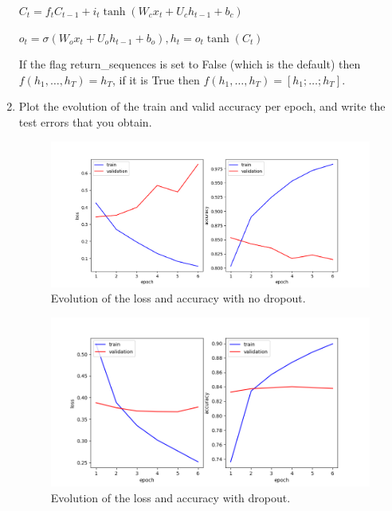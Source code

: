 \documentclass{article} %
\begin{document}
\begin{enumerate}
\begin{center}
        $C_t = f_t C_{t - 1} + i_t \tanh(W_c x_t + U_c h_{t - 1} + b_c)$

        $o_t = \sigma(W_o x_t + U_o h_{t - 1} + b_o), h_t = o_t \tanh(C_t)$
    \end{center}

    If the flag return\_sequences is set to False (which is the default) then
    $f(h_1,\ldots,h_T) = h_T$, if it is True then $f(h_1,\ldots,h_T) = [h_1; \ldots; h_T]$.

    \item
    Plot the evolution of the train and valid accuracy per epoch, and write the
    test errors that you obtain.

    \begin{figure}[ht]
    \includegraphics[width=\textwidth,height=\textheight,keepaspectratio]{img/lstm_no_dropout_loss_acc.png}
    \caption{Evolution of the loss and accuracy with no dropout.}
    \end{figure}

    \begin{figure}[ht]
    \includegraphics[width=\textwidth,height=\textheight,keepaspectratio]{img/lstm_dropout_loss_acc.png}
    \caption{Evolution of the loss and accuracy with dropout.}
    \end{figure}


\end{enumerate}
\end{document}
